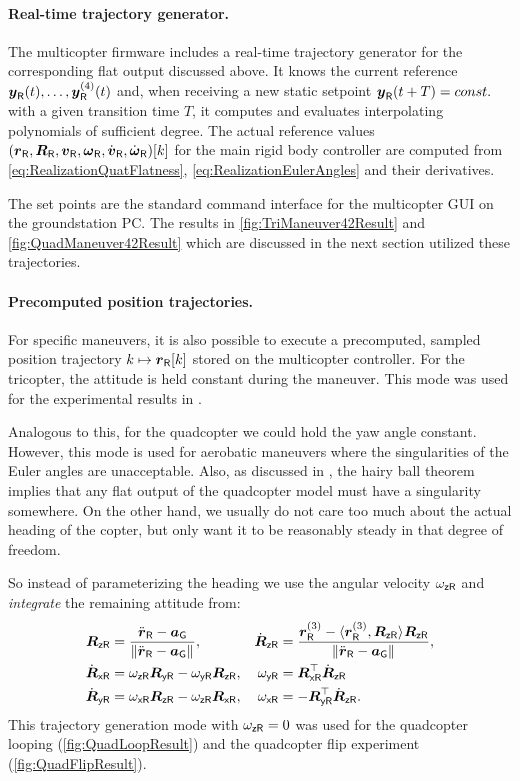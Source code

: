 \paragraph{Real-time trajectory generator.}
The multicopter firmware includes a real-time trajectory generator for the corresponding flat output discussed above.
It knows the current reference $\boldsymbol{y}_{\mathsf{R}}(t), \ldots, \boldsymbol{y}^{(4)}_{\mathsf{R}}(t)$ and, when receiving a new static setpoint $\boldsymbol{y}_{\mathsf{R}}(t+T) = const.$ with a given transition time $T$, it computes and evaluates interpolating polynomials of sufficient degree.
The actual reference values $(\boldsymbol{r}_{\mathsf{R}}, \boldsymbol{R}_{\mathsf{R}}, \boldsymbol{v}_{\mathsf{R}}, \boldsymbol{\omega}_{\mathsf{R}}, \dot{\boldsymbol{v}}_{\mathsf{R}}, \dot{\boldsymbol{\omega}}_{\mathsf{R}})[k]$ for the main rigid body controller are computed from \eqref{eq:RealizationQuatFlatness}, \eqref{eq:RealizationEulerAngles} and their derivatives.

The set points are the standard command interface for the multicopter GUI on the groundstation PC.
The results in \autoref{fig:TriManeuver42Result} and \autoref{fig:QuadManeuver42Result} which are discussed in the next section utilized these trajectories.

\paragraph{Precomputed position trajectories.}
For specific maneuvers, it is also possible to execute a precomputed, sampled position trajectory $k \mapsto \boldsymbol{r}_{\mathsf{R}}[k]$ stored on the multicopter controller.
For the tricopter, the attitude is held constant during the maneuver.
This mode was used for the experimental results in \cite{Irscheid:HeavyRopesTricopter}.

Analogous to this, for the quadcopter we could hold the yaw angle constant.
However, this mode is used for aerobatic maneuvers where the singularities of the Euler angles are unacceptable.
Also, as discussed in \cite{Konz:QuadrotorMovingFrame}, the hairy ball theorem \cite{Brouwer:HairyBallTheorem} implies that any flat output of the quadcopter model must have a singularity somewhere.
On the other hand, we usually do not care too much about the actual heading of the copter, but only want it to be reasonably steady in that degree of freedom.

So instead of parameterizing the heading we use the angular velocity $\omega_{\mathsf{z}\mathsf{R}}$ and \textit{integrate} the remaining attitude from:
\begin{subequations}
\begin{align}
 \boldsymbol{R}_{\mathsf{z}\mathsf{R}} &= \frac{\ddot{\boldsymbol{r}}_{\mathsf{R}} - \boldsymbol{a}_{\mathsf{G}}}{\| \ddot{\boldsymbol{r}}_{\mathsf{R}} - \boldsymbol{a}_{\mathsf{G}} \|_{}},&
 \dot{\boldsymbol{R}}_{\mathsf{z}\mathsf{R}} &= \frac{\boldsymbol{r}^{(3)}_{\mathsf{R}} - \langle \boldsymbol{r}^{(3)}_{\mathsf{R}}, \boldsymbol{R}_{\mathsf{z}\mathsf{R}} \rangle_{} \boldsymbol{R}_{\mathsf{z}\mathsf{R}}}{\| \ddot{\boldsymbol{r}}_{\mathsf{R}} - \boldsymbol{a}_{\mathsf{G}} \|_{}},
\\
 \dot{\boldsymbol{R}}_{\mathsf{x}\mathsf{R}} &= \omega_{\mathsf{z}\mathsf{R}} \boldsymbol{R}_{\mathsf{y}\mathsf{R}} - \omega_{\mathsf{y}\mathsf{R}} \boldsymbol{R}_{\mathsf{z}\mathsf{R}},&
 \omega_{\mathsf{y}\mathsf{R}} &= \boldsymbol{R}_{\mathsf{x}\mathsf{R}}^\top \dot{\boldsymbol{R}}_{\mathsf{z}\mathsf{R}}
\\
 \dot{\boldsymbol{R}}_{\mathsf{y}\mathsf{R}} &= \omega_{\mathsf{x}\mathsf{R}} \boldsymbol{R}_{\mathsf{z}\mathsf{R}} - \omega_{\mathsf{z}\mathsf{R}} \boldsymbol{R}_{\mathsf{x}\mathsf{R}},&
 \omega_{\mathsf{x}\mathsf{R}} &= -\boldsymbol{R}_{\mathsf{y}\mathsf{R}}^\top \dot{\boldsymbol{R}}_{\mathsf{z}\mathsf{R}}.
\end{align}
\end{subequations}
This trajectory generation mode with $\omega_{\mathsf{z}\mathsf{R}}=0$ was used for the quadcopter looping (\autoref{fig:QuadLoopResult}) and the quadcopter flip experiment (\autoref{fig:QuadFlipResult}).


